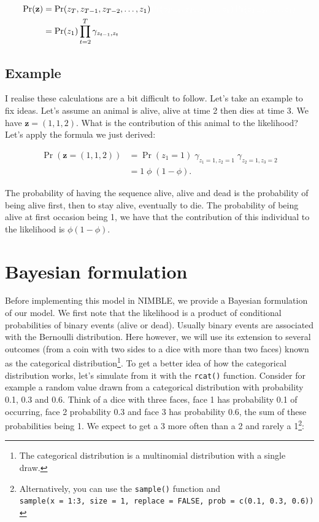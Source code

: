 \documentclass[
  12pt,
]{krantz}
\begin{document}
\begin{align*}
\Pr(\mathbf{z}) &= \Pr(z_T, z_{T-1}, z_{T-2}, \ldots, z_1) \color{white}{\Pr(z_{T-1}, z_{T-2},\ldots, z_1) \Pr(z_{T-2}, \ldots, z_1)}\\
                &= \Pr(z_{1}) \prod_{t=2}^T{\gamma_{z_{t-1},z_{t}}}\\
\end{align*}

\hypertarget{example}{%
\subsection{Example}\label{example}}

I realise these calculations are a bit difficult to follow. Let's take an example to fix ideas. Let's assume an animal is alive, alive at time 2 then dies at time 3. We have \(\mathbf{z} = (1, 1, 2)\). What is the contribution of this animal to the likelihood? Let's apply the formula we just derived:

\begin{align*}
\Pr(\mathbf{z} = (1, 1, 2)) &= \Pr(z_1 = 1) \; \gamma_{z_{1} = 1, z_{2} = 1} \; \gamma_{z_{2} = 1, z_{3} = 2}\\
                            &= 1 \; \phi \; (1 - \phi).
\end{align*}

The probability of having the sequence alive, alive and dead is the probability of being alive first, then to stay alive, eventually to die. The probability of being alive at first occasion being 1, we have that the contribution of this individual to the likelihood is \(\phi (1 - \phi)\).

\hypertarget{bayesian-formulation}{%
\section{Bayesian formulation}\label{bayesian-formulation}}

Before implementing this model in NIMBLE, we provide a Bayesian formulation of our model. We first note that the likelihood is a product of conditional probabilities of binary events (alive or dead). Usually binary events are associated with the Bernoulli distribution. Here however, we will use its extension to several outcomes (from a coin with two sides to a dice with more than two faces) known as the categorical distribution\footnote{The categorical distribution is a multinomial distribution with a single draw.}. To get a better idea of how the categorical distribution works, let's simulate from it with the \texttt{rcat()} function. Consider for example a random value drawn from a categorical distribution with probability 0.1, 0.3 and 0.6. Think of a dice with three faces, face 1 has probability 0.1 of occurring, face 2 probability 0.3 and face 3 has probability 0.6, the sum of these probabilities being 1. We expect to get a 3 more often than a 2 and rarely a 1\footnote{Alternatively, you can use the \texttt{sample()} function and \texttt{sample(x\ =\ 1:3,\ size\ =\ 1,\ replace\ =\ FALSE,\ prob\ =\ c(0.1,\ 0.3,\ 0.6))}}:
\end{document}
